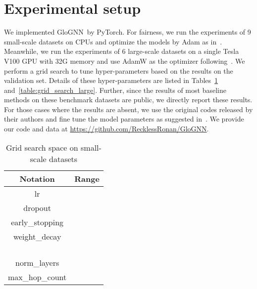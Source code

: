 \documentclass[nohyperref]{article}
\theoremstyle{plain}
\theoremstyle{definition}
\theoremstyle{remark}
\newcommand{\ada}{GloGNN}
\begin{document}
\section{Experimental setup}
\label{sec:setup}
We implemented \ada\ by PyTorch.
For fairness,
we run the experiments of 9 small-scale datasets on CPUs 
and optimize the models by Adam as in~\cite{yan2021two}.
Meanwhile,
we run the experiments of 6 large-scale datasets on a single Tesla V100 GPU with 32G memory
and use AdamW as the optimizer following~\cite{lim2021large}.
We perform a grid search to tune hyper-parameters based on the results on the validation set.
Details of these hyper-parameters are listed in Tables~\ref{table:grid_search_small} and~\ref{table:grid_search_large}.
Further,
since the results of most baseline methods on these benchmark datasets are public,
we directly report these results.
For those cases where the results are absent,
we use the original codes released by their authors and fine tune the model parameters as suggested in~\cite{yan2021two,lim2021large,suresh2021breaking}.
We provide our code and data at \url{https://github.com/RecklessRonan/GloGNN}.


\begin{table}[!htbp]
\caption{Grid search space on small-scale datasets}
\centering
\begin{tabular}{|c|c|}
    \hline
    {\bf Notation} & {\bf Range} \\ \hline
     lr  &  \\ \hline 
      dropout &  \\ \hline 
       early\_stopping  &  \\ \hline 
        weight\_decay  &  \\ \hline 
           &  \\ \hline 
           &  \\ \hline 
           &  \\ \hline  
            &  \\ \hline 
            norm\_layers  &  \\ \hline 
             max\_hop\_count   &  \\ \hline 
\end{tabular}
\label{table:grid_search_small}
\end{table}
\end{document}
